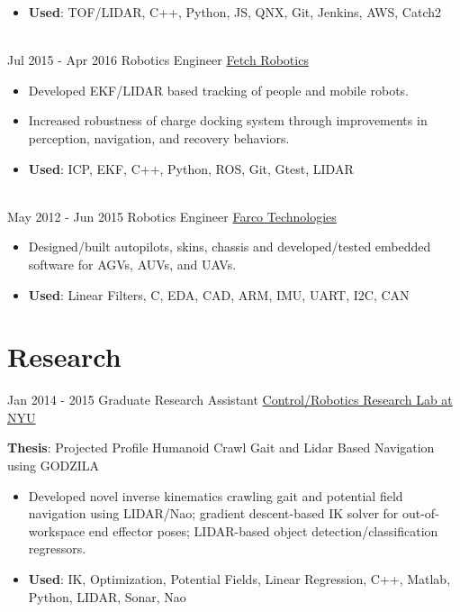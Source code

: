 \documentclass[letterpaper]{twentysecondcv} %
\begin{document}
\begin{twenty}
{{\begin{itemize}
        \item \textbf{Used}: TOF/LIDAR, C++, Python, JS, QNX, Git, Jenkins, AWS, Catch2
        \end{itemize}}
        }
    \\   
    \twentyitem
   		{Jul 2015 -}
		{Apr 2016}
        {Robotics Engineer}
        {\href{http://www.fetchrobotics.com}{Fetch Robotics}}
        {}
        {
        {\begin{itemize}
          \item Developed EKF/LIDAR based tracking of people and mobile robots.
          \item Increased robustness of charge docking system through improvements in perception, navigation, and recovery behaviors.
          \item \textbf{Used}: ICP, EKF, C++, Python, ROS, Git, Gtest, LIDAR
        \end{itemize}}
        }
     \\
     \twentyitem
   		{May 2012 -}
		{Jun 2015}
        {Robotics Engineer}
        {\href{http://www.farcotech.com/}{Farco Technologies}}
        {}
        {
        {\begin{itemize}
          \item Designed/built autopilots, skins, chassis and developed/tested embedded software for AGVs, AUVs, and UAVs.
          \item \textbf{Used}: Linear Filters, C, EDA, CAD, ARM, IMU, UART, I2C, CAN
        \end{itemize}}
        }
        
\end{twenty}

\section{Research}
\begin{twenty}
	\twentyitem
    	{Jan 2014 -}
		{2015}
        {Graduate Research Assistant}
        {\href{http://crrl.poly.edu/}{Control/Robotics Research Lab at NYU}}
        {}
        {
       	\textbf{Thesis}: Projected Profile Humanoid Crawl Gait and Lidar Based Navigation using GODZILA
        {\begin{itemize}
          \item Developed novel inverse kinematics crawling gait and potential field navigation using LIDAR/Nao;
                gradient descent-based IK solver for out-of-workspace end effector poses;
                LIDAR-based object detection/classification regressors.
          \item \textbf{Used}: IK, Optimization, Potential Fields, Linear Regression, C++, Matlab, Python, LIDAR, Sonar, Nao
		\end{itemize}}
        }
\end{twenty}
\end{document}
